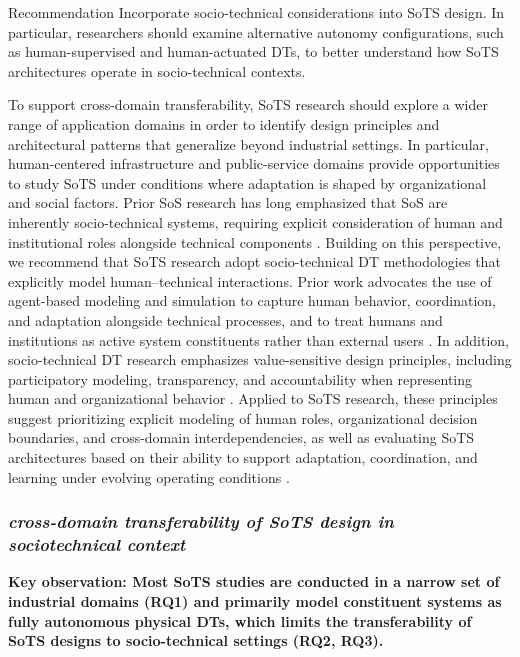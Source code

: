 \begin{recoframe}{Recommendation}
Incorporate socio-technical considerations into SoTS design. In particular, researchers should examine alternative autonomy configurations, such as human-supervised and human-actuated DTs, to better understand how SoTS architectures operate in socio-technical contexts.
\end{recoframe}

To support cross-domain transferability, SoTS research should explore a wider range of application domains in order to identify design principles and architectural patterns that generalize beyond industrial settings. In particular, human-centered infrastructure and public-service domains provide opportunities to study SoTS under conditions where adaptation is shaped by organizational and social factors. Prior SoS research has long emphasized that SoS are inherently socio-technical systems, requiring explicit consideration of human and institutional roles alongside technical components \cite{siemieniuch2014extending}. Building on this perspective, we recommend that SoTS research adopt socio-technical DT methodologies that explicitly model human–technical interactions. Prior work advocates the use of agent-based modeling and simulation to capture human behavior, coordination, and adaptation alongside technical processes, and to treat humans and institutions as active system constituents rather than external users \cite{barn2022sociotechnical,ye2023developing}. In addition, socio-technical DT research emphasizes value-sensitive design principles, including participatory modeling, transparency, and accountability when representing human and organizational behavior \cite{barn2022sociotechnical}. Applied to SoTS research, these principles suggest prioritizing explicit modeling of human roles, organizational decision boundaries, and cross-domain interdependencies, as well as evaluating SoTS architectures based on their ability to support adaptation, coordination, and learning under evolving operating conditions \cite{ye2023developing}.




\subsubsection{\textit{cross-domain transferability of SoTS design in sociotechnical context}}

\textbf{Key observation: Most SoTS studies are conducted in a narrow set of industrial domains (RQ1) and primarily model constituent systems as fully autonomous physical DTs, which limits the transferability of SoTS designs to socio-technical settings (RQ2, RQ3).}

